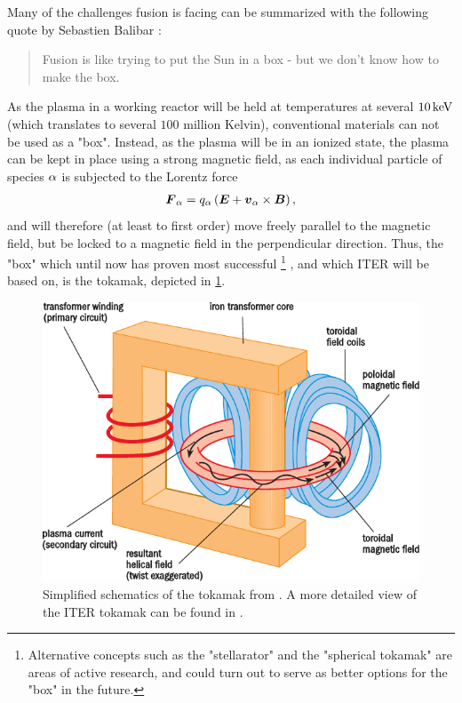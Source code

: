 Many of the challenges fusion is facing can be summarized with the following quote by Sebastien Balibar \cite{Balibar2009Web}:
%
\begin{quote}
    Fusion is like trying to put the Sun in a box - but we don't know how to make the box.
\end{quote}
%
As the plasma in a working reactor will be held at temperatures at several $10 \, \text{keV}$ (which translates to several $100$ million Kelvin), conventional materials can not be used as a "box".
Instead, as the plasma will be in an ionized state, the plasma can be kept in place using a strong magnetic field, as each individual particle of species $\alpha$ is subjected to the Lorentz force
%
\begin{align*}
    \boldsymbol{F}_\alpha = q_\alpha \left(\boldsymbol{E} + \boldsymbol{v}_\alpha\times\boldsymbol{B}\right),
\end{align*}
%
and will therefore (at least to first order) move freely parallel to the magnetic field, but be locked to a magnetic field in the perpendicular direction.
Thus, the "box" which until now has proven most successful%
\footnote{Alternative concepts such as the "stellarator" and the "spherical tokamak" are areas of active research, and could turn out to serve as better options for the "box" in the future.}
%
, and which ITER will be based on, is the tokamak, depicted in \cref{fig:tokamak}.
%
\begin{figure}[htb]
    \begin{center}
        \includegraphics{fig/intro/tokamak}
    \end{center}
    \caption{Simplified schematics of the tokamak from \cite{nuttall2008}.
        A more detailed view of the ITER tokamak can be found in \cite{ITERWeb}.}
    \label{fig:tokamak}
\end{figure}

